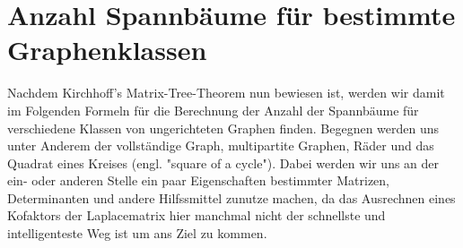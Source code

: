 
\section{Anzahl Spannbäume für bestimmte Graphenklassen}
Nachdem Kirchhoff's Matrix-Tree-Theorem nun bewiesen ist, werden wir damit im Folgenden Formeln für die Berechnung der Anzahl der Spannbäume für verschiedene Klassen von ungerichteten Graphen finden. Begegnen werden uns unter Anderem der vollständige Graph, multipartite Graphen, Räder und das Quadrat eines Kreises (engl. "square of a cycle"). Dabei werden wir uns an der ein- oder anderen Stelle ein paar Eigenschaften bestimmter Matrizen, Determinanten und andere Hilfssmittel zunutze machen, da das Ausrechnen eines Kofaktors der Laplacematrix hier manchmal nicht der schnellste und intelligenteste Weg ist um ans Ziel zu kommen. 








